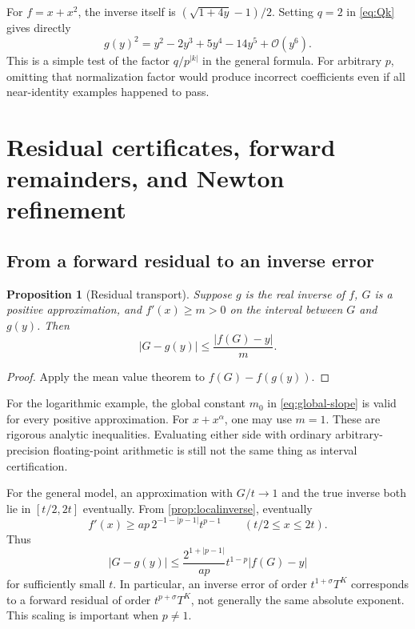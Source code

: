 \documentclass[11pt,a4paper]{article}
\newtheorem{proposition}[theorem]{Proposition}
\theoremstyle{definition}
\theoremstyle{remark}
\newcommand{\OO}{\mathcal O}
\begin{document}
For $f=x+x^2$, the inverse itself is $(\sqrt{1+4y}-1)/2$. Setting $q=2$ in
\eqref{eq:Qk} gives directly
\[
 g(y)^2=y^2-2y^3+5y^4-14y^5+\OO(y^6).
\]
This is a simple test of the factor $q/p^{|k|}$ in the general formula.
For arbitrary $p$, omitting that normalization factor would produce incorrect
coefficients even if all near-identity examples happened to pass.

\section{Residual certificates, forward remainders, and Newton refinement}
\label{sec:residual}

\subsection{From a forward residual to an inverse error}

\begin{proposition}[Residual transport]\label{prop:residual}
Suppose $g$ is the real inverse of $f$, $G$ is a positive approximation, and
$f'(x)\ge m>0$ on the interval between $G$ and $g(y)$. Then
\begin{equation}\label{eq:residual-bound}
 |G-g(y)|\le\frac{|f(G)-y|}{m}.
\end{equation}
\end{proposition}

\begin{proof}
Apply the mean value theorem to $f(G)-f(g(y))$.
\end{proof}

For the logarithmic example, the global constant $m_0$ in
\eqref{eq:global-slope} is valid for every positive approximation. For
$x+x^\alpha$, one may use $m=1$. These are rigorous analytic inequalities.
Evaluating either side with ordinary arbitrary-precision floating-point
arithmetic is still not the same thing as interval certification.

For the general model, an approximation with $G/t\to1$ and the true inverse
both lie in $[t/2,2t]$ eventually. From \cref{prop:localinverse}, eventually
\[
 f'(x)\ge ap\,2^{-1-|p-1|}t^{p-1}\qquad(t/2\le x\le2t).
\]
Thus
\begin{equation}\label{eq:scaledresidual}
 |G-g(y)|\le\frac{2^{1+|p-1|}}{ap}
 t^{1-p}|f(G)-y|
\end{equation}
for sufficiently small $t$. In particular, an inverse error of order
$t^{1+\sigma}T^K$ corresponds to a forward residual of order
$t^{p+\sigma}T^K$, not generally the same absolute exponent. This scaling is
important when $p\ne1$.
\end{document}
